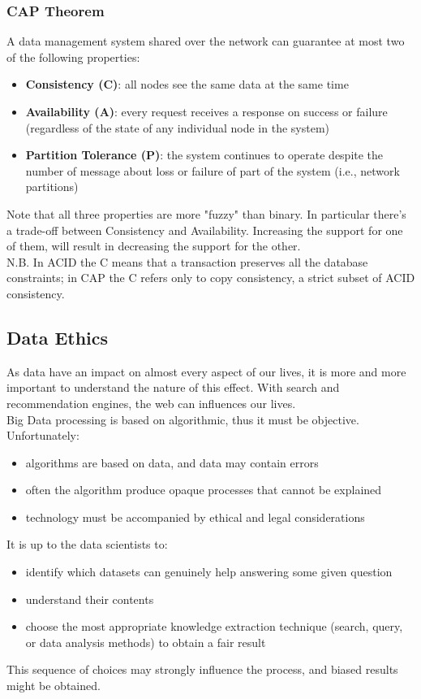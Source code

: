 \documentclass[10pt,a4paper]{article}
\begin{document}
\subsubsection{CAP Theorem}
A data management system shared over the network can guarantee at most two of the following properties:
\begin{itemize}
	\item \textbf{Consistency (C)}: all nodes see the same data at the same time
	\item \textbf{Availability (A)}: every request receives a response on success or failure (regardless of the
state of any individual node in the system)
	\item \textbf{Partition Tolerance (P)}: the system continues to operate despite the number of message about loss or failure of part of the system (i.e., network partitions)
\end{itemize}
Note that all three properties are more "fuzzy" than binary. In particular there's a trade-off between Consistency and Availability. Increasing the support for one of them, will result in decreasing the support for the other. \\
N.B. In ACID the C means that a transaction preserves all the database constraints; in CAP the C refers only to copy consistency, a strict subset of ACID consistency.
\pagebreak
\subsection{Data Ethics}
As data have an impact on almost every aspect of our lives, it is more and more important to understand the nature of this effect. With search and recommendation engines, the web can influences our lives. \\
Big Data processing is based on algorithmic, thus it must be objective. Unfortunately:
\begin{itemize}
	\item algorithms are based on data, and data may contain errors
	\item often the algorithm produce opaque processes that cannot be explained
	\item technology must be accompanied by ethical and legal considerations
\end{itemize}
It is up to the data scientists to:
\begin{itemize}
	\item identify which datasets can genuinely help answering some given question
	\item understand their contents
	\item choose the most appropriate knowledge extraction technique (search, query, or data analysis methods) to obtain a fair result
\end{itemize}
This sequence of choices may strongly influence the process, and biased results might be obtained.
\end{document}
